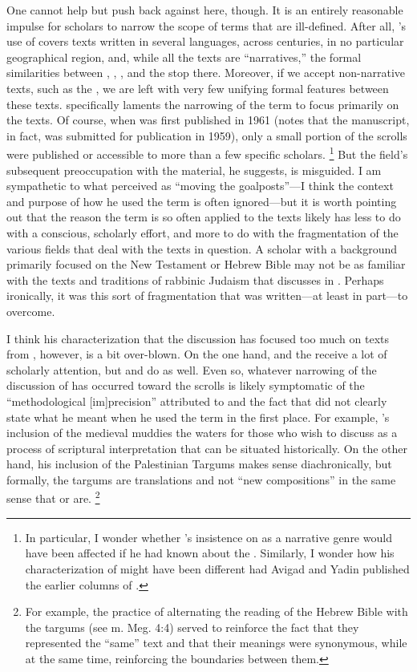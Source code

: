 One cannot help but push back against \vermes here, though. It is an entirely reasonable impulse for scholars to narrow the scope of terms that are ill-defined. After all, \vermes's use of \rwb covers texts written in several languages, across centuries, in no particular geographical region, and, while all the texts are ``narratives,'' the formal similarities between \ga, \antiquities, \jub, and the \pTarg stop there. Moreover, if we accept non-narrative texts, such as the \templescroll, we are left with very few unifying formal features between these texts. \vermes specifically laments the narrowing of the term \rwb to focus primarily on the \dss texts. Of course, when  was first published in 1961 (\vermes notes that the manuscript, in fact, was submitted for publication in 1959), only a small portion of the scrolls were published or accessible to more than a few specific scholars.%
    \footnote{%
        In particular, I wonder whether \vermes's insistence on \rwb as a narrative genre would have been affected if he had known about the \templescroll. Similarly, I wonder how his characterization of \ga might have been different had Avigad and Yadin published the earlier columns of \ga.}
But the field's subsequent preoccupation with the \qumran material, he suggests, is misguided. I am sympathetic to what \vermes perceived as ``moving the goalposts''---I think the context and purpose of how he used the term \rwb is often ignored---but it is worth pointing out that the reason the term \rwb is so often applied to the \qumran texts likely has less to do with a conscious, scholarly effort, and more to do with the fragmentation of the various fields that deal with the texts in question. A scholar with a background primarily focused on the New Testament or Hebrew Bible may not be as familiar with the texts and traditions of rabbinic Judaism that \vermes discusses in . Perhaps ironically, it was this sort of fragmentation that  was written---at least in part---to overcome.

I think his characterization that the discussion has focused too much on texts from \qumran, however, is a bit over-blown. On the one hand, \ga and the \templescroll receive a lot of scholarly attention, but \jub and \antiquities do as well. Even so, whatever narrowing of the discussion of \rwb has occurred toward the \qumran scrolls is likely symptomatic of the ``methodological [im]precision'' attributed to  and the fact that \vermes did not clearly state what he meant when he used the term in the first place. For example, \vermes's inclusion of the medieval \sefer muddies the waters for those who wish to discuss \rwb as a process of scriptural interpretation that can be situated historically. On the other hand, his inclusion of the Palestinian Targums makes sense diachronically, but formally, the targums are translations and not ``new compositions'' in the same sense that \jub or \ga are.%
    \footnote{%
        For example, the practice of alternating the reading of the Hebrew Bible with the targums (see m. Meg. 4:4) served to reinforce the fact that they represented the ``same'' text and that their meanings were synonymous, while at the same time, reinforcing the boundaries between them.}

